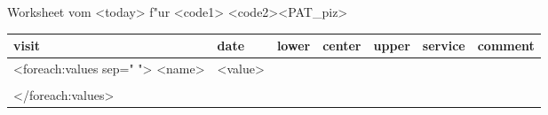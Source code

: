 \documentclass{scrreprt}
\begin{document}
\noindent Worksheet {\it <Voller Titel>} vom <today> f"ur <code1> <code2><PAT_piz> \\

\begin{tabular}{lllllll}
visit &  date&  lower  & center & upper & service& comment \tabularnewline
\hline
 <foreach:values sep=" ">
<name> &<value>\\
\tabularnewline
</foreach:values>
\hline
\end{tabular}
\end{document}
